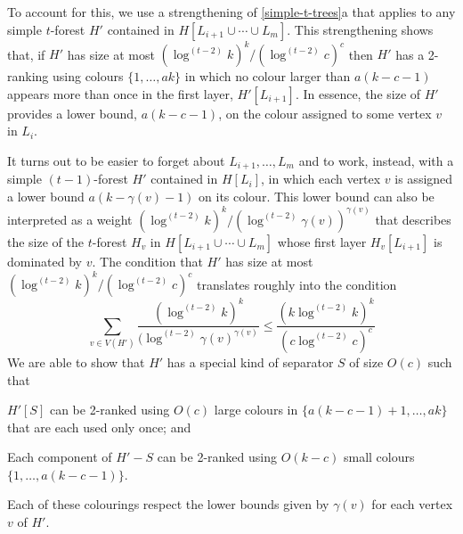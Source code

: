 \documentclass[kpfonts]{patmorin}
\theoremstyle{named}
\newcommand{\weirdref}[2]{\cref{#1}#2}
\begin{document}
To account for this, we use a strengthening of \weirdref{simple-t-trees}{a} that applies to any simple $t$-forest $H'$ contained in $H[L_{i+1}\cup\cdots\cup L_m]$.  This strengthening shows that, if $H'$ has size at most $(\log^{(t-2)} k)^k/(\log^{(t-2)} c)^c$ then $H'$ has a 2-ranking using colours $\{1,\ldots,ak\}$ in which no colour larger than $a(k-c-1)$ appears more than once in the first layer, $H'[L_{i+1}]$.  In essence, the size of $H'$ provides a lower bound, $a(k-c-1)$, on the colour assigned to some vertex $v$ in $L_i$.

It turns out to be easier to forget about $L_{i+1},\ldots,L_{m}$ and to work, instead, with a simple $(t-1)$-forest $H'$ contained in $H[L_i]$, in which each vertex $v$ is assigned a lower bound $a(k-\gamma(v)-1)$ on its colour.  This lower bound can also be interpreted as a weight  $(\log^{(t-2)}k)^k/(\log^{(t-2)}\gamma(v))^{\gamma(v)}$ that describes the size of the $t$-forest $H_v$ in $H[L_{i+1}\cup\cdots\cup L_m]$ whose first layer $H_v[L_{i+1}]$ is dominated by $v$.  The condition that $H'$ has size at most $(\log^{(t-2)} k)^k/(\log^{(t-2)} c)^c$ translates roughly into the condition
\[
   \sum_{v\in V(H')}\frac{(\log^{(t-2)}k)^k}{(\log^{(t-2)}\gamma(v)^{\gamma(v)}} \le \frac{(k\log^{(t-2)} k)^k}{(c\log^{(t-2)} c)^c}
\]
We are able to show that $H'$ has a special kind of separator $S$ of size $O(c)$ such that
\begin{compactenum}
    \item $H'[S]$ can be 2-ranked using $O(c)$ large colours in $\{a(k-c-1)+1,\ldots,ak\}$ that are each used only once; and
    \item Each component of $H'-S$ can be 2-ranked using $O(k-c)$ small colours $\{1,\ldots,a(k-c-1)\}$.
\end{compactenum}
Each of these colourings respect the lower bounds given by $\gamma(v)$ for each vertex $v$ of $H'$.
\end{document}
